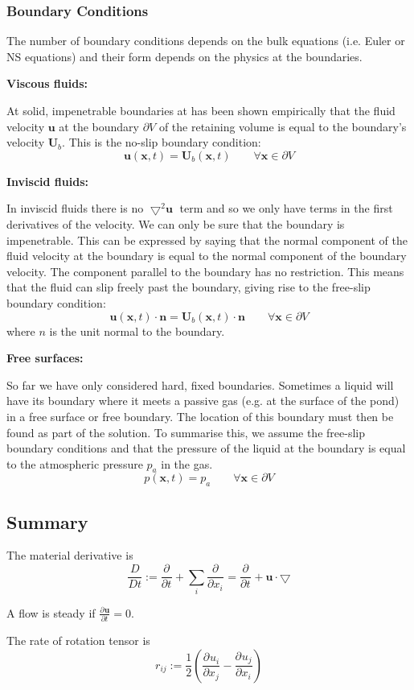 \documentclass[11pt]{article}
\newcommand*{\pd}[3][]{\ensuremath{\frac{\partial^{#1} {#2}}{\partial {#3}^{#1}}}}
\newcommand*{\md}[1]{\ensuremath{\frac{D #1}{D t}}}
\newcommand{\grad}{\bigtriangledown}
\newcommand{\defeq}{:=}
\newcommand{\mv}[1]{\textbf{#1}}
\newcommand{\mdf}[1]{{\color{red}#1}}
\begin{document}
\subsubsection{Boundary Conditions}
The number of boundary conditions depends on the bulk equations (i.e. Euler or NS equations) and their form depends on the physics at the boundaries.

\textbf{Viscous fluids:}

At solid, impenetrable boundaries at has been shown empirically that the fluid velocity $\mv{u}$ at the boundary $\partial V$ of the retaining volume is equal to the boundary's velocity $\mv{U}_b$. This is the \mdf{no-slip boundary condition}:
$$\mv{u}(\mv{x},t)=\mv{U}_b(\mv{x},t)\quad\quad\forall\mv{x}\in\partial V$$

\textbf{Inviscid fluids:}

In inviscid fluids there is no $\grad^2 \mv{u}$ term and so we only have terms in the first derivatives of the velocity.
We can only be sure that the boundary is impenetrable.
This can be expressed by saying that the normal component of the fluid velocity at the boundary is equal to the normal component of the boundary velocity.
The component parallel to the boundary has no restriction.
This means that the fluid can slip freely past the boundary, giving rise to the \mdf{free-slip boundary condition}:
$$\mv{u}(\mv{x},t)\cdot\mv{n}=\mv{U}_b(\mv{x},t)\cdot\mv{n}\quad\quad\forall\mv{x}\in\partial V$$
where $n$ is the unit normal to the boundary.

\textbf{Free surfaces:}

So far we have only considered hard, fixed boundaries. Sometimes a liquid will have its boundary where it meets a passive gas (e.g. at the surface of the pond) in a \mdf{free surface} or \mdf{free boundary}.
The location of this boundary must then be found as part of the solution.
To summarise this, we assume the free-slip boundary conditions and that the pressure of the liquid at the boundary is equal to the atmospheric pressure $p_a$ in the gas.
$$p(\mv{x},t)=p_a\quad\quad\forall\mv{x}\in\partial V$$

\subsection{Summary}
The \mdf{material derivative} is
$$\md{}\defeq\pd{}{t}+\sum_i \pd{}{x_i}=\pd{}{t}+\mv{u}\cdot\grad$$

A flow is \mdf{steady} if $\pd{\mv{u}}{t}=0$.

The \mdf{rate of rotation tensor} is 
$$r_{ij}\defeq\frac{1}{2}\left(\pd{u_i}{x_j}-\pd{u_j}{x_i}\right)$$
\end{document}
